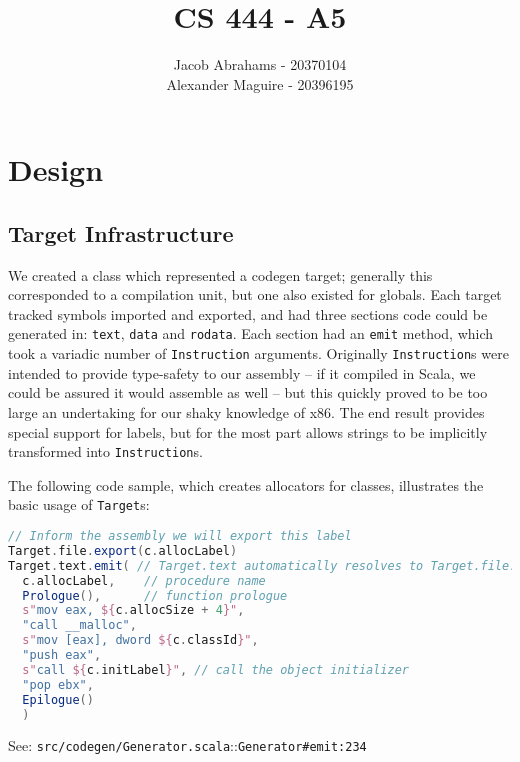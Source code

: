 \documentclass{article}
\title{CS 444 - A5}
\author{Jacob Abrahams - 20370104\\ Alexander Maguire - 20396195}
\begin{document}
\newcommand\type[1]{\texttt{#1}}
\newcommand\func[1]{\texttt{#1}}
\newcommand\code[1]{\texttt{#1}}
\renewcommand\value[1]{\texttt{#1}}
\newcommand\source[2]{See: \texttt{src/#1.scala}::\type{#2} \\}
\newcommand\testsrc[1]{See: \texttt{test/#1.scala} \\}

\maketitle


\section{Design}

\subsection{Target Infrastructure}
We created a class which represented a codegen target; generally this corresponded to a compilation unit, but one also
existed for globals. Each target tracked symbols imported and exported, and had three sections code could be generated
in: \type{text}, \type{data} and \type{rodata}. Each section had an \func{emit} method, which took a variadic number of
\type{Instruction} arguments. Originally \type{Instruction}s were intended to provide type-safety to our assembly -- if it
compiled in Scala, we could be assured it would assemble as well -- but this quickly proved to be too large an
undertaking for our shaky knowledge of x86. The end result provides special support for labels, but for the most part
allows strings to be implicitly transformed into \type{Instruction}s.

The following code sample, which creates allocators for classes, illustrates the basic usage of \type{Target}s:

\begin{lstlisting}[language=Scala]
// Inform the assembly we will export this label
Target.file.export(c.allocLabel)
Target.text.emit( // Target.text automatically resolves to Target.file.text
  c.allocLabel,    // procedure name
  Prologue(),      // function prologue
  s"mov eax, ${c.allocSize + 4}",
  "call __malloc",
  s"mov [eax], dword ${c.classId}",
  "push eax",
  s"call ${c.initLabel}", // call the object initializer
  "pop ebx",
  Epilogue()
  )
\end{lstlisting}
\source{codegen/Generator}{Generator\#emit:234}
\end{document}
